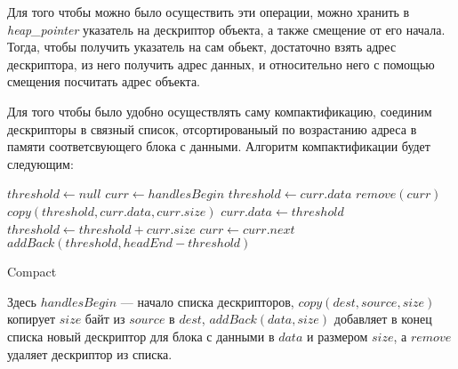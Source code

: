 \documentclass[12pt,a4paper]{article}
\begin{document}
Для того чтобы можно было осуществить эти операции, можно хранить в \textit{heap\_pointer}
указатель на дескриптор объекта, а также смещение от его начала. Тогда, чтобы получить
указатель на сам обьект, достаточно взять адрес дескриптора, из него 
получить адрес данных, и относительно него с помощью смещения посчитать адрес объекта. 

Для того чтобы было удобно осуществлять саму компактификацию, соединим дескрипторы в связный список, отсортированыый по возрастанию адреса в памяти
соответсвующего блока с данными. Алгоритм компактификации будет следующим:

\begin{algorithm}[H]
\begin{algorithmic}[1]
\State $threshold\gets null$
\State $curr\gets handlesBegin$
			\State $threshold\gets curr.data$		
		\EndIf
		\State $remove(curr)$		
			\State $copy(threshold, curr.data, curr.size)$
			\State $curr.data\gets threshold$
			\State $threshold\gets threshold + curr.size$
		\EndIf
	\State $curr\gets curr.next$
\EndWhile
\State $addBack(threshold, headEnd - threshold)$
\end{algorithmic}
\caption{Compact}
\end{algorithm}

Здесь $handlesBegin$ --- начало списка дескрипторов, $copy(dest, source, size)$ копирует
$size$ байт из $source$ в $dest$, $addBack(data, size)$ добавляет в конец списка
новый дескриптор для блока с данными в $data$ и размером $size$, а $remove$ удаляет
дескриптор из списка.

\newpage
\end{document}

